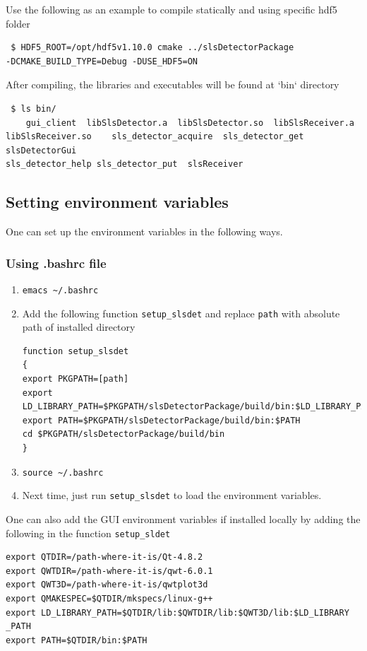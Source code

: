 \documentclass{article}
\begin{document}
Use the following as an example to compile statically and using specific hdf5
folder 
\begin{verbatim}
 $ HDF5_ROOT=/opt/hdf5v1.10.0 cmake ../slsDetectorPackage
-DCMAKE_BUILD_TYPE=Debug -DUSE_HDF5=ON
\end{verbatim}

After compiling, the libraries and executables will be found at `bin` directory 
\begin{verbatim}
 $ ls bin/
    gui_client  libSlsDetector.a  libSlsDetector.so  libSlsReceiver.a 
libSlsReceiver.so    sls_detector_acquire  sls_detector_get  slsDetectorGui 
sls_detector_help sls_detector_put  slsReceiver
\end{verbatim}




\subsection{Setting environment variables}
One can set up the environment variables in the following ways.

\subsubsection{Using .bashrc file}
\begin{enumerate}
 \item \verb=emacs ~/.bashrc=
 \item Add the following function \verb=setup_slsdet= and replace \verb=path=
with absolute path of installed directory
\begin{verbatim}
function setup_slsdet
{ 
export PKGPATH=[path]
export LD_LIBRARY_PATH=$PKGPATH/slsDetectorPackage/build/bin:$LD_LIBRARY_PATH
export PATH=$PKGPATH/slsDetectorPackage/build/bin:$PATH
cd $PKGPATH/slsDetectorPackage/build/bin
} 
\end{verbatim}
  \item \verb=source ~/.bashrc=
  \item Next time, just run \verb=setup_slsdet= to load the environment
variables.
\end{enumerate}


One can also add the GUI environment variables if installed locally by adding
the following in the function \verb=setup_sldet= \\
\begin{verbatim}
export QTDIR=/path-where-it-is/Qt-4.8.2
export QWTDIR=/path-where-it-is/qwt-6.0.1
export QWT3D=/path-where-it-is/qwtplot3d
export QMAKESPEC=$QTDIR/mkspecs/linux-g++
export LD_LIBRARY_PATH=$QTDIR/lib:$QWTDIR/lib:$QWT3D/lib:$LD_LIBRARY _PATH
export PATH=$QTDIR/bin:$PATH
\end{verbatim}
\end{document}

